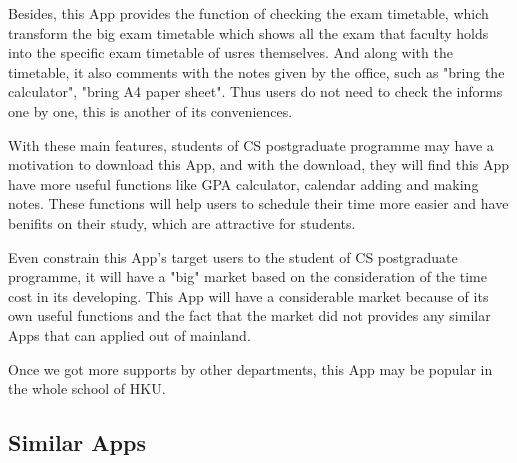 \documentclass{article}
\begin{document}
    Besides, this App provides the function of checking the exam timetable,
    which transform the big exam timetable 
    which shows all the exam that faculty holds into 
    the specific exam timetable of usres themselves.
    And along with the timetable, it also comments with the notes
    given by the office, such as "bring the calculator", 
    "bring A4 paper sheet".
    Thus users do not need to check the informs one by one, 
    this is another of its conveniences.

    With these main features, students of CS postgraduate programme
    may have a motivation to download this App, and with the download,
    they will find this App have more useful functions like 
    GPA calculator, calendar adding and making notes.
    These functions will help users to schedule their time more easier
    and have benifits on their study, which are attractive for students.

    Even constrain this App's target users to 
    the student of CS postgraduate programme, 
    it will have a "big" market based on the consideration of
    the time cost in its developing.
    This App will have a considerable market because of 
    its own useful functions and the fact 
    that the market did not provides any similar Apps 
    that can applied out of mainland.

    Once we got more supports by other departments, 
    this App may be popular in the whole school of HKU.





    \subsection{Similar Apps}
\end{document}
